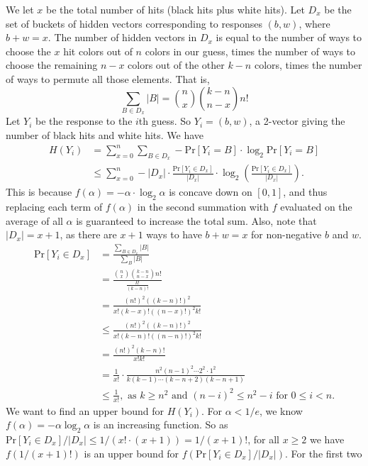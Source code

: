 \documentclass[12pt, a4paper]{article}
\begin{document}
We let $x$ be the total number of hits (black hits plus white hits). Let $D_x$ be the
set of buckets of hidden vectors corresponding to responses $(b,w)$, where $b+w=x$.
The number of hidden vectors in $D_x$ is equal to the number of ways to choose the
$x$ hit colors out of $n$ colors in our guess, times the number of ways to choose
the remaining $n-x$ colors out of the other $k-n$ colors, times the number of ways
to permute all those elements.
That is,
    \begin{equation*}
    \sum_{B\in D_x}|B| = \binom{n}{x}\binom{k-n}{n-x} n!
	\end{equation*}
Let $Y_i$ be the response to the $i$th guess. So $Y_i=(b,w)$, a 2-vector giving the
number of black hits and white hits. We have
    \begin{align*}
    H(Y_i)&=\sum_{x=0}^n \sum_{B\in D_x}-\text{Pr}[Y_i=B]\cdot\log_2\text{Pr}[Y_i=B] \\
    &\leq  \sum_{x=0}^n -|D_x|\cdot \frac{\text{Pr}[Y_i\in D_x]}{|D_x|}\cdot
    \log_2 \left(\frac{\text{Pr}[Y_i\in D_x]}{|D_x|}\right).
    \end{align*}
This is because $f(\alpha) = -\alpha\cdot\log_2 \alpha$ is concave down on
$[0,1]$, and thus replacing each term of
$f(\alpha)$ in the second summation with $f$ evaluated on the average
of all $\alpha$ is guaranteed to increase the total sum. Also, note that
$|D_x|=x+1$, as there are $x+1$ ways to have $b+w=x$ for non-negative $b$ and $w$.
    \begin{align*}
    \text{Pr}[Y_i\in D_x]&=\frac{\sum_{B\in D_x} |B|}{\sum_{B} |B|}\\
    &=\frac{\binom{n}{x}\binom{k-n}{n-x}n!}{\frac{k!}{(k-n)!}}\\
    &=\frac{(n!)^2((k-n)!)^2}{x!(k-x)!((n-x)!)^2 k!}\\
    &\le \frac{(n!)^2((k-n)!)^2}{x!(k-n)!((n-n)!)^2 k!}\\
    &=\frac{(n!)^2(k-n)!}{x! k!}\\
    &=\frac{1}{x!}\cdot\frac{n^2(n-1)^2\cdots 2^2\cdot 1^2}{k(k-1)
    \cdots(k-n+2)(k-n+1)} \\
    &\le \frac{1}{x!}, \text{ as $k \ge n^2$ and $(n-i)^2 \le n^2-i$ for $0\le i<n$.}
    \end{align*}
We want to find an upper bound for $H(Y_i)$. For
$\alpha<1/e$, we know $f(\alpha)=-\alpha\log_2\alpha$ is an increasing function. So as
$\text{Pr}[Y_i\in D_x]/|D_x|\le 1/(x!\cdot (x+1))=1/(x+1)!$, for all $x\ge 2$ we have
$f(1/(x+1)!)$ is an upper bound for $f(\text{Pr}[Y_i\in D_x]/|D_x|)$. For the first two
\end{document}
